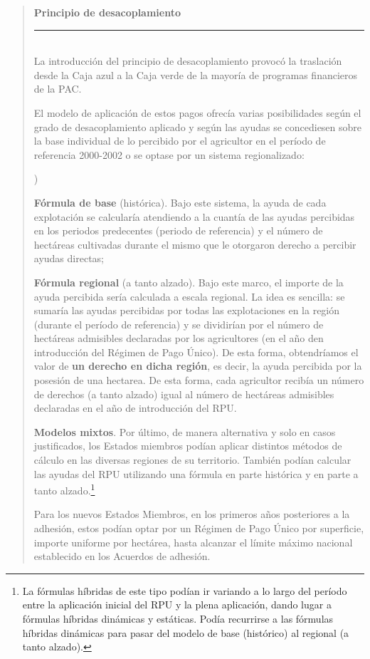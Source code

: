 \documentclass[10pt,a4paper]{article}
\newcounter{alphaitem}
\newenvironment{la}
      {\begin{list}{\alph{alphaitem})}{%
          \usecounter{alphaitem}%
          \setlength{\leftmargin}{1cm}%
          \setlength{\parskip}{3pt}%
          \setlength{\itemsep}{0pt}%
          \setlength{\parsep}{0pt}%
      }}
      {\end{list}}
\newenvironment{specialblock}[1]{%
      \begin{quote} %
      \small %
      \noindent\textbf{#1}\\[-0.3em] %
      \rule{\linewidth}{0.4pt}\\[0.6em]}{
      \end{quote}}
\begin{document}
\begin{specialblock}{Principio de desacoplamiento}
    La introducción del principio de desacoplamiento provocó la traslación desde la Caja azul a la Caja verde de la mayoría de programas financieros de la PAC. 
    
    El modelo de aplicación de estos pagos ofrecía varias posibilidades según el grado de desacoplamiento aplicado y según las ayudas se concediesen sobre la base individual de lo percibido por el agricultor en el período de referencia 2000-2002 o se optase por un sistema regionalizado:
    \begin{la}
      \item \textbf{Fórmula de base} (histórica). Bajo este sistema, la ayuda de cada explotación se calcularía atendiendo a la cuantía de las ayudas percibidas en los periodos predecentes (periodo de referencia) y el número de hectáreas cultivadas durante el mismo que le otorgaron derecho a percibir ayudas directas;
      \item \textbf{Fórmula regional} (a tanto alzado). Bajo este marco, el importe de la ayuda percibida sería calculada a escala regional. La idea es sencilla: se sumaría las ayudas percibidas por todas las explotaciones en la región (durante el período de referencia) y se dividirían por el número de hectáreas admisibles declaradas por los agricultores (en el año den introducción del Régimen de Pago Único). De esta forma, obtendríamos el valor de \textbf{un derecho en dicha región}, es decir, la ayuda percibida por la posesión de una hectarea. De esta forma, cada agricultor recibía un número de derechos (a tanto alzado) igual al número de hectáreas admisibles declaradas en el año de introducción del RPU.
      \item \textbf{Modelos mixtos}. Por último, de manera alternativa y solo en casos justificados, los Estados miembros podían aplicar distintos métodos de cálculo en las diversas regiones de su territorio. También podían calcular las ayudas del RPU utilizando una fórmula en parte histórica y en parte a tanto alzado.\footnote{%
          La fórmulas híbridas de este tipo podían ir variando a lo largo del período entre la aplicación inicial del RPU y la plena aplicación, dando lugar a fórmulas híbridas dinámicas y estáticas. Podía recurrirse a las fórmulas híbridas dinámicas para pasar del modelo de base (histórico) al regional (a tanto alzado).
      }
    \end{la}

    Para los nuevos Estados Miembros, en los primeros años posteriores a la adhesión, estos podían optar por un Régimen de Pago Único por superficie, importe uniforme por hectárea, hasta alcanzar el límite máximo nacional establecido en los Acuerdos de adhesión. 
\end{specialblock}
\end{document}
